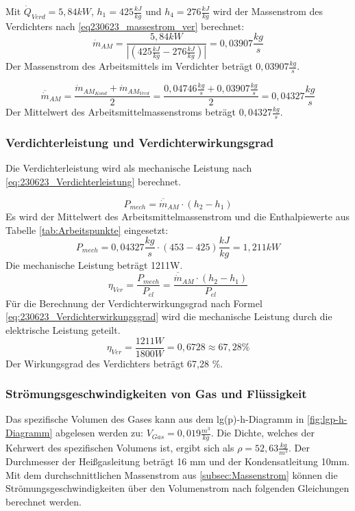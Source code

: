 Mit $\dot Q_{Verd}=5,84kW$, $h_1=425\frac{kJ}{kg}$ und $h_4=276\frac{kJ}{kg}$ wird der Massenstrom des Verdichters nach \autoref*{eq230623_massestrom_ver} berechnet:
$$\dot m_{AM} = \frac{5,84 kW}{|(425\frac{kJ}{kg}-276\frac{kJ}{kg})|} = 0,03907 \frac{kg}{s}$$
Der Massenstrom des Arbeitsmittels im Verdichter beträgt $0,03907 \frac{kg}{s}$.

$$\overline{\dot m}_{AM} = \frac{\dot m_{AM_{Kond}}+\dot m_{AM_{Verd}}}{2} = \frac{0,04746 \frac{kg}{s}+0,03907 \frac{kg}{s}}{2} = 0,04327 \frac{kg}{s} $$
Der Mittelwert des Arbeitsmittelmassenstroms beträgt $ 0,04327\frac{kg}{s}$.

\subsubsection{Verdichterleistung und Verdichterwirkungsgrad}

Die Verdichterleistung wird als mechanische Leistung nach \autoref{eq:230623_Verdichterleistung} berechnet.

\begin{equation}
    P_{mech} = \overline{\dot m}_{AM} \cdot (h_2-h_1)
\label{eq:230623_Verdichterleistung}
\end{equation}
Es wird der Mittelwert des Arbeitsmittelmassenstrom und die Enthalpiewerte aus Tabelle \ref{tab:Arbeitspunkte} eingesetzt:
$$  P_{mech} = 0,04327 \frac{kg}{s} \cdot (453-425)\frac{kJ}{kg} = 1,211 kW $$
Die mechanische Leistung beträgt 1211W.
\begin{equation}
  \eta_{Ver} = \frac{P_{mech}}{P_{el}}=\frac{\overline{\dot m}_{AM}\cdot (h_2-h_1)}{P_{el}}
\label{eq:230623_Verdichterwirkungsgrad}
\end{equation}
Für die Berechnung der Verdichterwirkungsgrad nach Formel \ref{eq:230623_Verdichterwirkungsgrad} wird die mechanische Leistung durch die elektrische Leistung geteilt.
$$\eta_{Ver} = \frac{1211W}{1800W}= 0,6728 \approx 67,28 \% $$
Der Wirkungsgrad des Verdichters beträgt 67,28 \%.
\subsubsection{Strömungsgeschwindigkeiten von Gas und Flüssigkeit}

Das spezifische Volumen des Gases kann aus dem lg(p)-h-Diagramm in \autoref{fig:lgp-h-Diagramm} abgelesen werden zu: $V_{Gas}=0,019 \frac{m^3}{kg}$. Die Dichte, welches der Kehrwert des spezifischen Volumens ist, ergibt sich als $\rho=52,63 \frac{kg}{m^3}$.
Der Durchmesser der Heißgasleitung beträgt 16 mm und der Kondensatleitung 10mm.
Mit dem durchschnittlichen Massenstrom aus \autoref{subsec:Massenstrom} können die Strömungsgeschwindigkeiten über den Volumenstrom nach folgenden Gleichungen berechnet werden.

